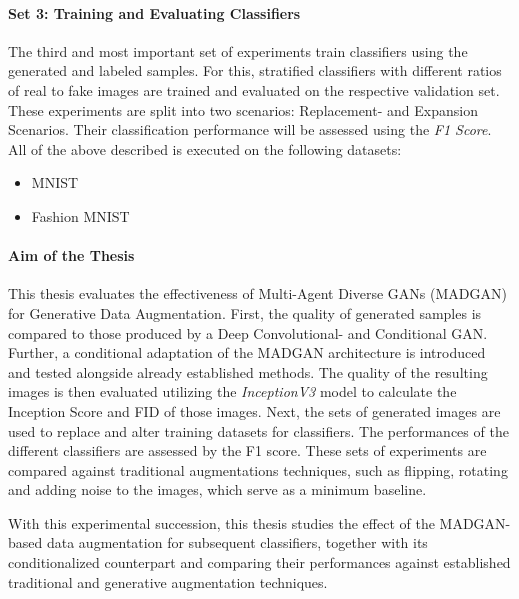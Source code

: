 \paragraph{Set 3: Training and Evaluating Classifiers}  \label{thesis_goal_3}
The third and most important set of experiments train classifiers using the generated and labeled samples. For this, stratified classifiers with different ratios of real to fake images are trained and evaluated on the respective validation set. These experiments are split into two scenarios: Replacement- and Expansion Scenarios. Their classification performance will be assessed using the \textit{F1 Score}.  \\

\noindent All of the above described is executed on the following datasets:
\begin{itemize}\label{used_datasets}
    \setlength{\itemsep}{-5pt}
    \item MNIST \cite{lecun2010mnist}
    \item Fashion MNIST \cite{xiao2017fashionmnist}
\end{itemize}


\paragraph{Aim of the Thesis}\label{aim_of_the_thesis}
This thesis evaluates the effectiveness of Multi-Agent Diverse GANs (MADGAN) for Generative Data Augmentation. First, the quality of generated samples is compared to those produced by a Deep Convolutional- and Conditional GAN. Further, a conditional adaptation of the MADGAN architecture is introduced and tested alongside already established methods. The quality of the resulting images is then evaluated utilizing the \textit{InceptionV3} model to calculate the Inception Score and FID of those images. Next, the sets of generated images are used to replace and alter training datasets for classifiers. The performances of the different classifiers are assessed by the F1 score. These sets of experiments are compared against traditional augmentations techniques, such as flipping, rotating and adding noise to the images, which serve as a minimum baseline. 

\noindent
With this experimental succession, this thesis studies the effect of the MADGAN-based data augmentation for subsequent classifiers, together with its conditionalized counterpart and comparing their performances against established traditional and generative augmentation techniques. 


\newpage

